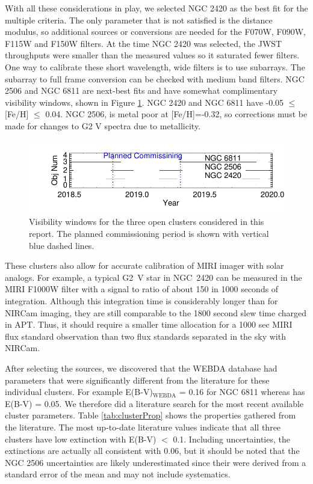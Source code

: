 \documentclass{aastex6}
\begin{document}
With all these considerations in play, we selected NGC 2420 as the best fit for the multiple criteria.
The only parameter that is not satisfied is the distance modulus, so additional sources or conversions are needed for the F070W, F090W, F115W and F150W filters.
At the time NGC 2420 was selected, the JWST throughputs were smaller than the measured values so it saturated fewer filters.
One way to calibrate these short wavelength, wide filters is to use subarrays.
The subarray to full frame conversion can be checked with medium band filters.
NGC 2506 and NGC 6811 are next-best fits and have somewhat complimentary visibility windows, shown in Figure \ref{fig:clusterVis}. NGC 2420 and NGC 6811 have -0.05 $\le$ [Fe/H] $\le$ 0.04.
NGC 2506, is metal poor at [Fe/H]=-0.32, so corrections must be made for changes to G2 V spectra due to metallicity.

\begin{figure}
\centering
\includegraphics[width=.4\columnwidth]{cluster_visibilty.pdf}
\caption{Visibility windows for the three open clusters considered in this report.
The planned commissioning period is shown with vertical blue dashed lines.}\label{fig:clusterVis}
\end{figure}

These clusters also allow for accurate calibration of MIRI imager with solar analogs.
For example, a typical G2~V star in NGC~2420 can be measured in the MIRI F1000W filter with a signal to ratio of about 150 in 1000 seconds of integration.
Although this integration time is considerably longer than for NIRCam imaging, they are still comparable to the 1800 second slew time charged in APT.
Thus, it should require a smaller time allocation for a 1000 sec MIRI flux standard observation than two flux standards separated in the sky with NIRCam.

After selecting the sources, we discovered that the WEBDA database had parameters that were significantly different from the literature for these individual clusters.
For example E(B-V)$_\mathrm{WEBDA}$ = 0.16 for NGC 6811 whereas \citet{molendaz2016spec6811} has E(B-V) = 0.05.
We therefore did a literature search for the most recent available cluster parameters.
Table \ref{tab:clusterProp} shows the properties gathered from the literature.
The most up-to-date literature values indicate that all three clusters have low extinction with E(B-V) $<$ 0.1.
Including uncertainties, the extinctions are actually all consistent with 0.06, but it should be noted that the NGC 2506 uncertainties are likely underestimated since their were derived from a standard error of the mean and may not include systematics.
\end{document}
